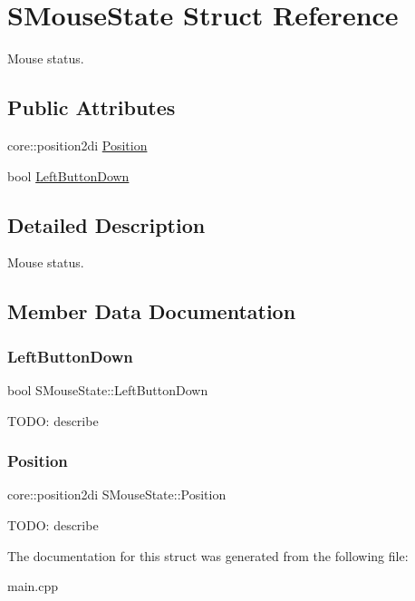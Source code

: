\hypertarget{struct_s_mouse_state}{}\section{S\+Mouse\+State Struct Reference}
\label{struct_s_mouse_state}


Mouse status.  


\subsection*{Public Attributes}
\begin{DoxyCompactItemize}
\item 
core\+::position2di \hyperlink{struct_s_mouse_state_a0e89a875bcf6ced1638d06c8bdf6e172}{Position}
\item 
bool \hyperlink{struct_s_mouse_state_a38522f3e2b4c04c6333a0cdfd649d52e}{Left\+Button\+Down}
\end{DoxyCompactItemize}


\subsection{Detailed Description}
Mouse status. 

\subsection{Member Data Documentation}
\mbox{\label{struct_s_mouse_state_a38522f3e2b4c04c6333a0cdfd649d52e}} 
\subsubsection{\texorpdfstring{Left\+Button\+Down}{LeftButtonDown}}
{\footnotesize\ttfamily bool S\+Mouse\+State\+::\+Left\+Button\+Down}

T\+O\+DO\+: describe \mbox{\label{struct_s_mouse_state_a0e89a875bcf6ced1638d06c8bdf6e172}} 
\subsubsection{\texorpdfstring{Position}{Position}}
{\footnotesize\ttfamily core\+::position2di S\+Mouse\+State\+::\+Position}

T\+O\+DO\+: describe 

The documentation for this struct was generated from the following file\+:\begin{DoxyCompactItemize}
\item 
main.\+cpp\end{DoxyCompactItemize}
